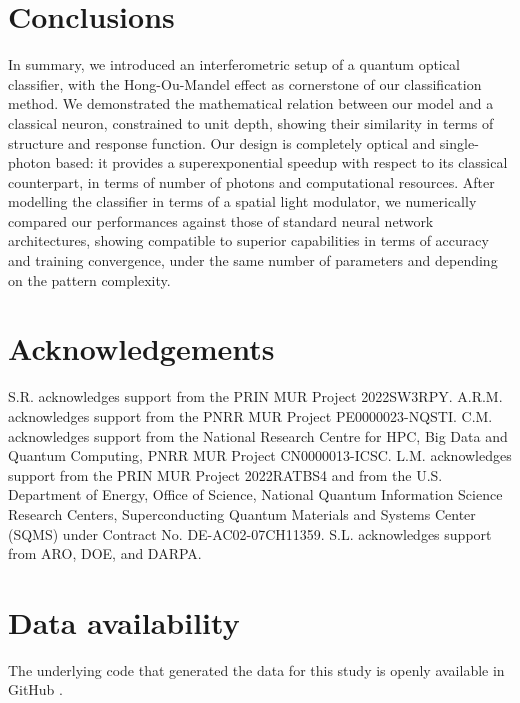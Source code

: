 \documentclass[reprint,
superscriptaddress,
nofootinbib,
aps,
pra,
showkeys
]{revtex4-2}
\begin{document}
\section{Conclusions}
In summary, we introduced an interferometric setup of a quantum optical classifier, with the Hong-Ou-Mandel effect as cornerstone of our classification method. We demonstrated the mathematical relation between our model and a classical neuron, constrained to unit depth, showing their similarity in terms of structure and response function. Our design is completely optical and single-photon based: it provides a superexponential speedup with respect to its classical counterpart, in terms of number of photons and computational resources. After modelling the classifier in terms of a spatial light modulator, we numerically compared our performances against those of standard neural network architectures, showing compatible to superior capabilities in terms of accuracy and training convergence, under the same number of parameters and depending on the pattern complexity.

\section*{Acknowledgements}
S.R. acknowledges support from the PRIN MUR Project 2022SW3RPY. A.R.M. acknowledges support from the PNRR MUR Project PE0000023-NQSTI. C.M. acknowledges support from the National Research Centre for HPC, Big Data and Quantum Computing, PNRR MUR Project CN0000013-ICSC. L.M. acknowledges support from the PRIN MUR Project 2022RATBS4 and from the U.S. Department of Energy, Office of Science, National Quantum Information Science Research Centers, Superconducting Quantum Materials and Systems Center (SQMS) under Contract No. DE-AC02-07CH11359. S.L. acknowledges support from ARO, DOE, and DARPA.

\section*{Data availability}
The underlying code that generated the data for this study is openly available in GitHub \citep{rep:QON}.
\end{document}
